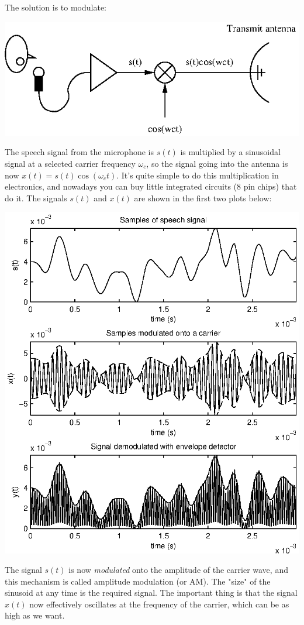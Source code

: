 \documentclass[10pt]{beamer}
\begin{document}
The solution is to modulate:
\begin{center}
  \includegraphics{radiocomms2}
\end{center}
The speech signal from the microphone is $s(t)$ is multiplied by a sinusoidal signal at a selected carrier frequency $\omega_c$, so the signal going into the antenna is now $x(t) = s(t) \cos(\omega_c t)$.  It's quite simple to do this multiplication in electronics, and nowadays you can buy little integrated circuits (8 pin chips) that do it.  The signals $s(t)$ and $x(t)$ are shown in the first two plots below:
\begin{center}
  \includegraphics{ec_example}
\end{center}
The signal $s(t)$ is now {\em modulated} onto the amplitude of the carrier wave, and this mechanism is called amplitude modulation (or AM).  The "size" of the sinusoid at any time is the required signal.  The important thing is that the signal $x(t)$ now effectively oscillates at the frequency of the carrier, which can be as high as we want.
\end{document}
